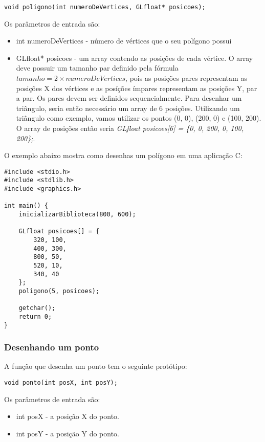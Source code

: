 \documentclass[12pt, %
openright,
oneside, %
a4paper,    %
brazil]{facom-ufu-abntex2}
\begin{document}
\begin{verbatim}
void poligono(int numeroDeVertices, GLfloat* posicoes);
\end{verbatim}

Os parâmetros de entrada são:

\begin{itemize}
    \item int numeroDeVertices - número de vértices que o seu polígono possui
    \item GLfloat* posicoes - um array contendo as posições de cada vértice. O array deve possuir um tamanho par definido pela fórmula \(tamanho = 2 \times numeroDeVertices \), pois as posições pares representam as posições X dos vértices e as posíções ímpares representam as posições Y, par a par. Os pares devem ser definidos sequencialmente. Para desenhar um triângulo, seria então necessário um array de 6 posições. Utilizando um triângulo como exemplo, vamos utilizar os pontos (0, 0), (200, 0) e (100, 200). O array de posições então seria \textit{GLfloat posicoes[6] = \{0, 0, 200, 0, 100, 200\};}.
\end{itemize}

O exemplo abaixo mostra como desenhas um polígono em uma aplicação C:

\begin{verbatim}
#include <stdio.h>
#include <stdlib.h>
#include <graphics.h>

int main() {
    inicializarBiblioteca(800, 600);

    GLfloat posicoes[] = {
        320, 100,
        400, 300,
        800, 50,
        520, 10,
        340, 40
    };
    poligono(5, posicoes);

    getchar();
    return 0;
}
\end{verbatim}

\subsubsection{Desenhando um ponto}
A função que desenha um ponto tem o seguinte protótipo:

\begin{verbatim}
void ponto(int posX, int posY);
\end{verbatim}

Os parâmetros de entrada são:

\begin{itemize}
    \item int posX - a posição X do ponto.
    \item int posY - a posição Y do ponto.
\end{itemize}
\end{document}
